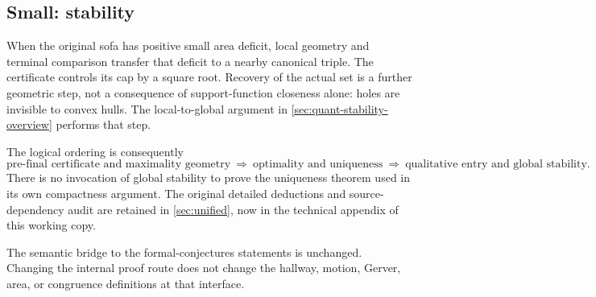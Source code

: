 \subsection{Small: stability}

When the original sofa has positive small area deficit, local geometry and
terminal comparison transfer that deficit to a nearby canonical triple.
The certificate controls its cap by a square root. Recovery of the actual
set is a further geometric step, not a consequence of support-function
closeness alone: holes are invisible to convex hulls. The local-to-global
argument in \cref{sec:quant-stability-overview} performs that step.

The logical ordering is consequently
\[
 \text{pre-final certificate and maximality geometry}
 \ \Longrightarrow\ \text{optimality and uniqueness}
 \ \Longrightarrow\ \text{qualitative entry and global stability}.
\]
There is no invocation of global stability to prove the uniqueness theorem
used in its own compactness argument. The original detailed deductions and
source-dependency audit are retained in \cref{sec:unified}, now in the
technical appendix of this working copy.

The semantic bridge to the formal-conjectures statements is unchanged.
Changing the internal proof route does not change the hallway, motion,
Gerver, area, or congruence definitions at that interface.
